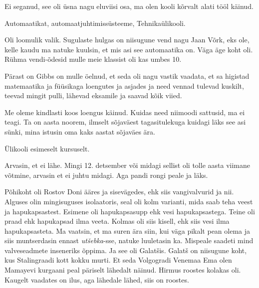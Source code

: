 
Ei seganud, see oli üsna nagu eluviisi osa,  ma olen kooli kõrvalt alati tööl käinud.
        
         
Automaatikat, automaatjuhtimissüsteeme, Tehnikaülikooli.


Oli loomulik valik. Sugulaste hulgas on niisugune vend nagu Jaan Võrk, eks ole, kelle kaudu ma natuke kuulsin, et mis asi see automaatika on. Väga äge koht oli. Rühma vendi-õdesid mulle  meie klassist oli kas umbes 10. 
                 
Pärast on Gibbs on mulle öelnud, et  seda oli nagu vastik vaadata, et sa higistad matemaatika ja füüsikaga loengutes ja asjades ja need vennad tulevad kuskilt, teevad  mingit pulli, lähevad eksamile ja saavad kõik viied. 


Me oleme kindlasti koos loengus käinud. Kuidas need niimoodi sattusid, ma ei teagi. Ta on aasta noorem, ilmselt  sõjaväest tagasitulekuga kuidagi läks see asi sünki, mina istusin oma kaks aastat sõjaväes ära.
                 

Ülikooli esimeselt kursuselt.

Arvasin, et ei lähe. Mingi 12. detsember või midagi sellist oli tolle aasta viimane võtmine, arvasin et ei juhtu midagi. Aga pandi rongi peale ja läks.


Põhikoht oli Rostov Doni ääres ja sisevägedes, ehk siis  vangivalvurid ja nii. Alguses olin  mingisuguses isolaatoris, seal oli kolm varianti, mida saab teha veest ja hapukapsastest. Esimene oli hapukapsasupp ehk vesi hapukapsastega. Teine oli praad ehk hapukapsad ilma veeta. Kolmas oli siis kisell, ehk siis vesi ilma hapukapsasteta. Ma vaatsin, et ma suren ära siin, kui väga pikalt pean olema  ja siis muntserdasin ennast \emph{utšebka}-sse, natuke luuletasin ka. Mispeale saadeti mind valveseadmete  inseneriks õppima. Ja see oli Galatšis. Galatš  on niisugune koht, kus Stalingraadi kott kokku murti. Et seda Volgogradi Venemaa Ema olen  Mamayevi kurgaani peal päriselt lähedalt näinud. Hirmus roostes kolakas oli. Kaugelt vaadates on ilus, aga lähedale lähed, siis on roostes.

